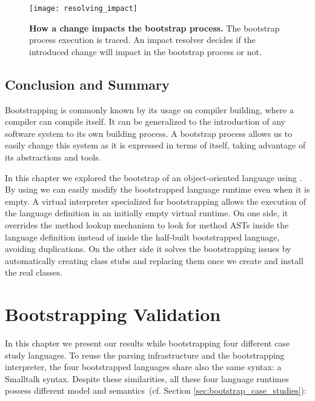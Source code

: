 \begin{figure}[ht]
\center
\texttt{[image: resolving\_impact]}
\caption{\textbf{How a change impacts the bootstrap process.} The bootstrap process execution is traced. An impact resolver decides if the introduced change will impact in the bootstrap process or not.\label{fig:resolving_impact}}
\end{figure}

\section{Conclusion and Summary}

Bootstrapping is commonly known by its usage on compiler building, where a compiler can compile itself.
It can be generalized to the introduction of any software system to its own building process.
A bootstrap process allows us to easily change this system as it is expressed in terms of itself, taking advantage of its abstractions and tools.

In this chapter we explored the bootstrap of an object-oriented language using \Vtt. By using \Vtt we can easily modify the bootstrapped language runtime even when it is empty. A virtual interpreter specialized for bootstrapping allows the execution of the language definition in an initially empty virtual runtime. On one side, it overrides the method lookup mechanism to look for method ASTs inside the language definition instead of inside the half-built bootstrapped language, avoiding duplications. On the other side it solves the bootstrapping issues by automatically creating class stubs and replacing them once we create and install the real classes.
%

\chapter{Bootstrapping Validation} \label{sec:bootstrapping_validation}
\minitoc
\introduction

In this chapter we present our results while bootstrapping four different case study languages.
To reuse the parsing infrastructure and the bootstrapping interpreter, the four bootstrapped languages share also the same syntax: a Smalltalk syntax. Despite these similarities, all these four language runtimes possess different model and semantics~(cf. Section \ref{sec:bootstrap_case_studies}):

